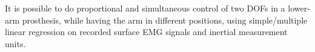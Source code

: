 It is possible to do proportional and simultaneous control of two DOFs in a lower-arm prosthesis, while having the arm in different positions, using simple/multiple linear regression on recorded surface EMG signals and inertial measurement units. %


